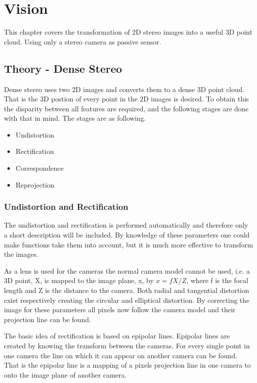 \chapter{Vision}


This chapter covers the transformation of 2D stereo images into a useful 3D point cloud. Using only a stereo camera as passive sensor.

\section{Theory - Dense Stereo}

Dense stereo uses two 2D images and converts them to a dense 3D point cloud. That is the 3D postion of every point in the 2D images is desired. To obtain this the disparity between all features are required, and the following stages are done with that in mind. The stages are as following.

\begin{itemize}
  \item Undistortion
  \item Rectification
  \item Correspondence
  \item Reprojection
\end{itemize}


\subsection{Undistortion and Rectification}


The undistortion and rectification is performed automatically and therefore only a short description will be included. By knowledge of these parameters one could make functions take them into account, but it is much more effective to transform the images.

As a lens is used for the cameras the normal camera model cannot be used, i.e. a 3D point, X, is mapped to the image plane, x, by $ x = f X/Z $, where f is the focal length and Z is the distance to the camera. Both radial and tangential distortion exist respectively creating the circular and elliptical distortion. By correcting the image for these parameters all pixels now follow the camera model and their projection line can be found.

The basic idea of rectification is based on epipolar lines. Epipolar lines are created by knowing the transform between the cameras. For every single point in one camera the line on which it can appear on another camera can be found. That is the epipolar line is a mapping of a pixels projection line in one camera to onto the image plane of another camera. 

